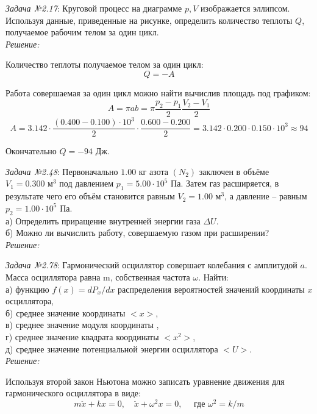 \documentclass[14pt,final,titlepage,pscyr]{hedsemwork}
\begin{document}
\maketitle
\emph{Задача №2.17}: Круговой процесс на диаграмме \( p, V \) изображается 
эллипсом. Используя данные, приведенные на рисунке, определить количество 
теплоты \( Q \), получаемое рабочим телом за один цикл. \\

\emph{Решение:}

Количество теплоты получаемое телом за один цикл:
\[
	Q = -A
\]

Работа совершаемая за один цикл можно найти вычислив площадь под графиком:
\[
	A = \pi ab = \pi\frac{p_2 - p_1}{2}\frac{V_2 - V_1}{2}
\]
\[
	A = 3.142\cdot\frac{(0.400-0.100)\cdot10^3}{2}\cdot\frac{0.600-0.200}{2} =
		3.142\cdot0.200\cdot0.150\cdot10^3 \approx 94
\]

Окончательно \( Q = -94 \) Дж.

\newpage
\emph{Задача №2.48}: Первоначально \( 1.00 \) кг азота \((N_2)\) заключен 
в объёме \( V_1 = 0.300 \text{ м}^3 \) под давлением 
\( p_1 = 5.00\cdot10^5 \) Па. Затем газ расширяется, в результате чего 
его объём становится равным \( V_2 = 1.00 \text{ м}^3 \), а давление -- 
равным \( p_2 = 1.00\cdot10^5 \) Па. \\
а) Определить приращение внутренней энергии газа \( \Delta U \). \\
б) Можно ли вычислить работу, совершаемую газом при расширении? \\

\emph{Решение:}

\newpage
\emph{Задача №2.78}: Гармонический осциллятор совершает колебания с 
амплитудой \( a \). Масса осциллятора равна m, собственная частота 
\( \omega \). Найти: \\
а) функцию \( f(x) = dP_x/dx \) распределения вероятностей значений 
	координаты \( x \) осциллятора, \\
б) среднее значение координаты \(<x>\), \\
в) среднее значение модуля координаты \(<|x|>\), \\
г) среднее значение квадрата координаты \(<x^2>\), \\
д) среднее значение потенциальной энергии осциллятора \(<U>\). \\

\emph{Решение:}

Используя второй закон Ньютона можно записать уравнение движения для 
гармонического осциллятора в виде:
\[
	m\ddot{x} + kx = 0, \quad
	\ddot{x} + \omega^2 x = 0, \quad \text{ где }\omega^2 = k/m
\]
\end{document}

